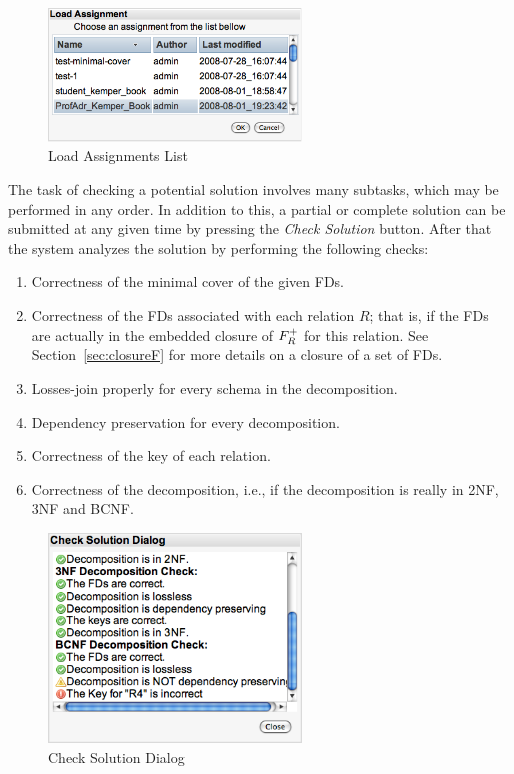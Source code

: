 \begin{figure}[h]
	\begin{center}
		\includegraphics[width=0.6\textwidth]{./img/screen02.png}
		\caption{Load Assignments List}
		\label{fig:screen02}
	\end{center}
\end{figure}

The task of checking a potential solution
involves many subtasks, which may be performed in any order. In addition to this,  a partial or complete 
solution can be submitted at any given time by pressing the \textit{Check Solution} button. 
After that the system analyzes the solution by performing the following checks:
\begin{enumerate}
	\item Correctness of the minimal cover of the given FDs. 
	\item Correctness of the FDs associated with each relation $R$; that is, 
    if the FDs are actually in the embedded closure of $F_{R}\sp{+}$ for this relation. 
    See Section~\ref{sec:closureF} for more details on a closure of a set of FDs.   
	\item Losses-join properly for every schema in the decomposition.
	\item Dependency preservation for every decomposition.
	\item Correctness of the key of each relation.
	\item Correctness of the decomposition, i.e., if the decomposition is really in 2NF, 3NF and BCNF.
\end{enumerate}

\begin{figure}[h]
	\begin{center}
		\includegraphics[width=0.6\textwidth]{./img/screen03a.png}
		\caption{Check Solution Dialog}
		\label{fig:screen03}
	\end{center}
\end{figure}

